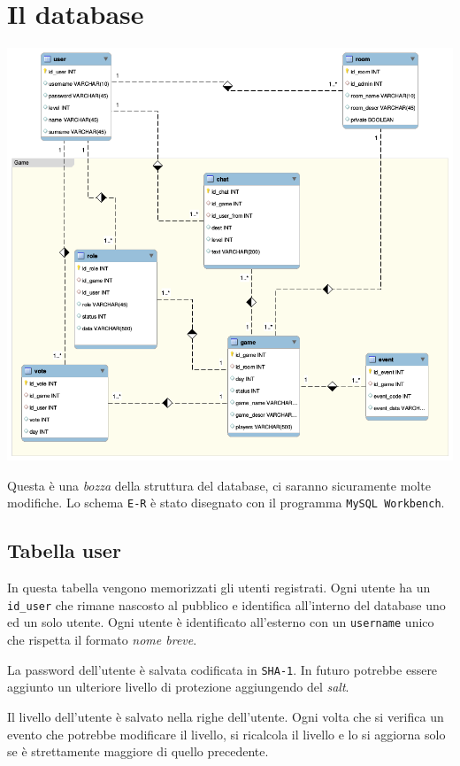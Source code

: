 \documentclass[10pt,a4paper]{article}
\begin{document}
\section{Il database}
\includegraphics[width = \textwidth]{database.png}

Questa è una \emph{bozza} della struttura del database, ci saranno sicuramente molte modifiche. Lo schema \texttt{E-R} è stato disegnato con il programma \texttt{MySQL Workbench}.

\subsection{Tabella user}
In questa tabella vengono memorizzati gli utenti registrati. Ogni utente ha un \texttt{id\_user} che rimane nascosto al pubblico e identifica all'interno del database uno ed un solo utente. Ogni utente è identificato all'esterno con un \texttt{username} unico che rispetta il formato \emph{nome breve}.

La password dell'utente è salvata codificata in \texttt{SHA-1}. In futuro potrebbe essere aggiunto un ulteriore livello di protezione aggiungendo del \emph{salt}.

Il livello dell'utente è salvato nella righe dell'utente. Ogni volta che si verifica un evento che potrebbe modificare il livello, si ricalcola il livello e lo si aggiorna solo se è strettamente maggiore di quello precedente.
\end{document}
